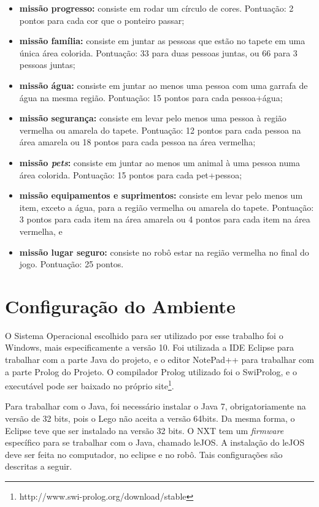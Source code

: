 \begin{itemize}
\item \textbf{missão progresso:} consiste em rodar um círculo de cores. Pontuação: 2 pontos para cada cor que o ponteiro passar;
\item \textbf{missão família:} consiste em juntar as pessoas que estão no tapete em uma única área colorida. Pontuação: 33 para duas pessoas juntas, ou 66 para 3 pessoas juntas;
\item \textbf{missão água:} consiste em juntar ao menos uma pessoa com uma garrafa de água na mesma região. Pontuação: 15 pontos para cada pessoa+água;
\item \textbf{missão segurança:} consiste em levar pelo menos uma pessoa à região vermelha ou amarela do tapete. Pontuação: 12 pontos para cada pessoa na área amarela ou 18 pontos para cada pessoa na área vermelha;
\item \textbf{missão \textit{pets}:} consiste em juntar ao menos um animal à uma pessoa numa área colorida. Pontuação: 15 pontos para cada pet+pessoa;
\item \textbf{missão equipamentos e suprimentos:} consiste em levar pelo menos um item, exceto a água, para a região vermelha ou amarela do tapete. Pontuação: 3 pontos para cada item na área amarela ou 4 pontos para cada item na área vermelha, e
\item \textbf{missão lugar seguro:} consiste no robô estar na região vermelha no final do jogo. Pontuação: 25 pontos. 
\end{itemize}

\section{Configuração do Ambiente}
	O Sistema Operacional escolhido para ser utilizado por esse trabalho foi o Windows, mais especificamente a versão 10. Foi utilizada a IDE Eclipse para trabalhar com a parte Java do projeto, e o editor NotePad++ para trabalhar com a parte Prolog do Projeto. O compilador Prolog utilizado foi o SwiProlog, e o executável pode ser baixado no próprio site\footnote{http://www.swi-prolog.org/download/stable}. 
	
	Para trabalhar com o Java, foi necessário instalar o Java 7, obrigatoriamente na versão de 32 bits, pois o Lego não aceita a versão 64bits. Da mesma forma, o Eclipse teve que ser instalado na versão 32 bits.
	O NXT tem um \textit{firmware} específico para se trabalhar com o Java, chamado leJOS. A instalação do leJOS deve ser feita no computador, no eclipse e no robô. Tais configurações são descritas a seguir.

